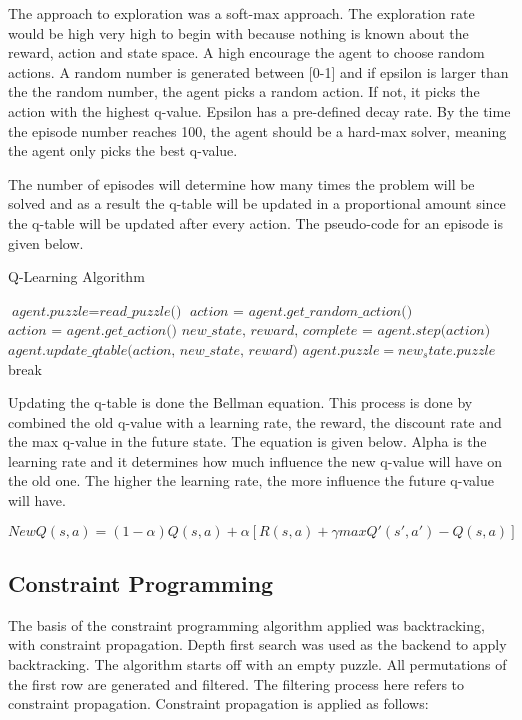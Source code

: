 \documentclass{svproc}
\begin{document}
The approach to exploration was a soft-max approach. The exploration rate \epsilon would be high very high to begin with because nothing is known about the reward, action and state space. A high \epsilon encourage the agent to choose random actions. A random number is generated between [0-1] and if epsilon is larger than the the random number, the agent picks a random action. If not, it picks the action with the highest q-value. Epsilon has a pre-defined decay rate. By the time the episode number reaches 100, the agent should be a hard-max solver, meaning the agent only picks the best q-value.

The number of episodes will determine how many times the problem will be solved and as a result the q-table will be updated in a proportional amount since the q-table will be updated after every action. The pseudo-code for an episode is given below.

\begin{algorithm}
    \caption{Q-Learning Algorithm}\label{euclid}
    \begin{algorithmic}[1]
    		\State $\textit{agent.puzzle} = \textit{read_puzzle()}$
    				\State $\textit{action = agent.get_random_action()}$
    			\EndIf
    			\Else
    				\State $\textit{action = agent.get_action()}$
    			\EndElse
    			\State $\textit{new_state, reward, complete = agent.step(action)}$
    			\State $\textit{agent.update_qtable(action, new_state, reward)}$
    			\State $agent.puzzle = new_state.puzzle$
    				break
    			\EndIf
    		\EndFor
    	\EndFor
    \end{algorithmic}
\end{algorithm}

Updating the q-table is done the Bellman equation. This process is done by combined the old q-value with a learning rate, the reward, the discount rate and the max q-value in the future state. The equation is given below. Alpha is the learning rate and it determines how much influence the new q-value will have on the old one. The higher the learning rate, the more influence the future q-value will have.

\begin{equation}
	NewQ(s, a) = (1 - \alpha)Q(s,a) + \alpha[R(s,a) + \gamma maxQ'(s', a') - Q(s,a)] 
\end{equation}

\subsection{Constraint Programming}
The basis of the constraint programming algorithm applied was backtracking, with constraint propagation. Depth first search was used as the backend to apply backtracking. The algorithm starts off with an empty puzzle. All permutations of the first row are generated and filtered. The filtering process here refers to  constraint propagation. Constraint propagation is applied as follows:
\end{document}
